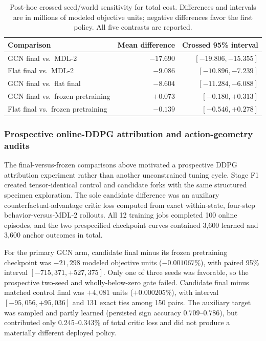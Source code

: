 \documentclass[preprint,review,12pt]{elsarticle}
\begin{document}
\begin{table}[htbp]
\centering
\caption{Post-hoc crossed seed/world sensitivity for total cost. Differences
and intervals are in millions of modeled objective units; negative differences
favor the first policy. All five contrasts are reported.}
\label{tab:routing_crossed_cost}
\begin{tabular}{lrr}
\hline
Comparison & Mean difference & Crossed 95\% interval \\
\hline
GCN final vs.\ MDL-2 & $-17.690$ & $[-19.806,-15.355]$ \\
Flat final vs.\ MDL-2 & $-9.086$ & $[-10.896,-7.239]$ \\
GCN final vs.\ flat final & $-8.604$ & $[-11.284,-6.088]$ \\
GCN final vs.\ frozen pretraining & $+0.073$ & $[-0.180,+0.313]$ \\
Flat final vs.\ frozen pretraining & $-0.139$ & $[-0.546,+0.278]$ \\
\hline
\end{tabular}
\end{table}

\subsubsection{Prospective online-DDPG attribution and action-geometry audits}

The final-versus-frozen comparisons above motivated a prospective DDPG
attribution experiment rather than another unconstrained tuning cycle. Stage F1
created tensor-identical control and candidate forks with the same structured
specimen exploration. The sole candidate difference was an auxiliary
counterfactual-advantage critic loss computed from exact within-state,
four-step behavior-versus-MDL-2 rollouts. All 12 training jobs completed 100
online episodes, and the two prespecified checkpoint curves contained 3,600
learned and 3,600 anchor outcomes in total.

For the primary GCN arm, candidate final minus its frozen pretraining
checkpoint was $-21{,}298$ modeled objective units ($-0.001067\%$), with paired
95\% interval $[-715{,}371,+527{,}375]$. Only one of three seeds was favorable,
so the prospective two-seed and wholly-below-zero gate failed. Candidate final
minus matched control final was $+4{,}081$ units ($+0.000205\%$), with interval
$[-95{,}056,+95{,}036]$ and 131 exact ties among 150 pairs. The auxiliary
target was sampled and partly learned (persisted sign accuracy 0.709--0.786),
but contributed only 0.245--0.343\% of total critic loss and did not produce a
materially different deployed policy.
\end{document}
